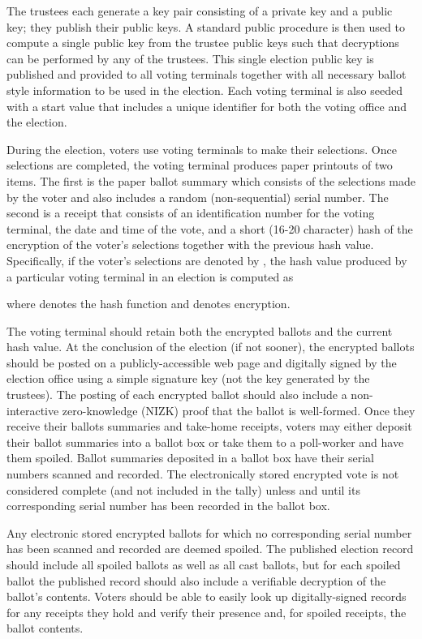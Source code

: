 \documentclass[letterpaper, 10pt, twocolumn]{article}
\begin{document}
The trustees each generate a key pair consisting of a private key and
a public key; they publish their public keys.  
A standard public
procedure is then used to compute a single public key from the 
trustee public keys such that decryptions can be performed by any 
of the trustees.  This single election public key  is published and
provided to all voting terminals together with all necessary
ballot style information to be used in the election.  
Each voting terminal is also seeded with a start value  that includes a
unique identifier for both the voting office and the election.

During the election, voters use voting terminals to make their
selections.  Once selections are completed, the voting terminal
produces paper printouts of two items.  The first is the paper ballot summary
which consists of the selections made by the voter and also includes a
random (non-sequential) serial number.  The second is a receipt that
consists of an identification number for the voting terminal,
the date and time of the vote, and a short (16-20 character) hash of the encryption of
the voter's selections together with the previous hash value.
Specifically, if the voter's selections are denoted by , the
 hash value produced by a particular voting terminal  in an election is computed as

\noindent
where  denotes the hash function and  denotes encryption.

The voting terminal should retain both the encrypted ballots and the current hash value.  At the conclusion of the election (if not sooner), the encrypted ballots should be posted on a publicly-accessible web page and digitally signed by the election office using a simple signature key (not the key generated by the trustees).  The posting of each encrypted ballot should also include a non-interactive zero-knowledge (NIZK) proof that the ballot is well-formed.
Once they receive their ballots summaries and take-home receipts, voters may either deposit their ballot summaries into a ballot box or take them to a poll-worker and have them spoiled.  Ballot summaries deposited in a ballot box have their serial numbers scanned and recorded.  The electronically stored encrypted vote is not considered complete (and not included in the tally) unless and until its corresponding serial number has been recorded in the ballot box.

Any electronic stored encrypted ballots for which no corresponding serial number has been scanned and recorded are deemed spoiled.  The published election record should include all spoiled ballots as well as all cast ballots, but for each spoiled ballot the published record should also include a verifiable decryption of the ballot's contents.  Voters should be able to easily look up digitally-signed records for any receipts they hold and verify their presence and, for spoiled receipts, the ballot contents.
\end{document}
